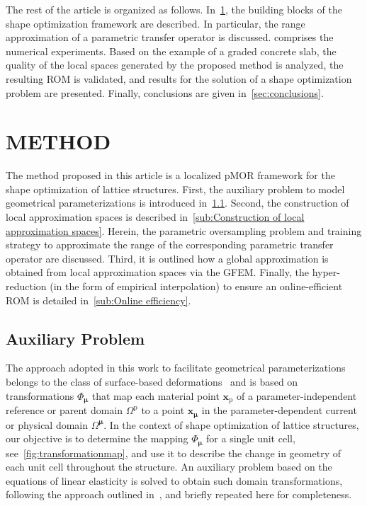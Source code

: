 \documentclass[a4paper]{eccomas_paper-2024}
\begin{document}
The rest of the article is organized as follows.
In~\cref{sec:method}, the building blocks of the shape optimization framework are described.
In particular, the range approximation of a parametric transfer operator is discussed.
 comprises the numerical experiments.
Based on the example of a graded concrete slab, the quality of the local spaces generated by the proposed method is analyzed, the resulting ROM is validated, and results for the solution of a shape optimization problem are presented.
Finally, conclusions are given in~\cref{sec:conclusions}.


\section{METHOD}%
\label{sec:method}
The method proposed in this article is a localized pMOR framework for the shape optimization of lattice structures.
First, the auxiliary problem to model geometrical parameterizations is introduced in~\cref{sub:Auxiliary Problem}.
Second, the construction of local approximation spaces is described in~\cref{sub:Construction of local approximation spaces}.
Herein, the parametric oversampling problem and training strategy to approximate the range of the corresponding parametric transfer operator are discussed.
Third, it is outlined how a global approximation is obtained from local approximation spaces via the GFEM.
Finally, the hyper-reduction (in the form of empirical interpolation) to ensure an online-efficient ROM is detailed in~\cref{sub:Online efficiency}.

\subsection{Auxiliary Problem} %
\label{sub:Auxiliary Problem}
The approach adopted in this work to facilitate geometrical parameterizations belongs to the class of surface-based deformations~\cite{Botsch2010Polygon} and is based on transformations $\Phi_{\bm\mu}$ that map each material point $\bm{x}_{\mathrm{p}}$ of a parameter-independent reference or parent domain $\varOmega^{\mathrm{p}}$ to a point $\bm{x}_{\bm\mu}$ in the parameter-dependent current or physical domain $\varOmega^{\bm\mu}$.
In the context of shape optimization of lattice structures, our objective is to determine the mapping $\Phi_{\bm\mu}$ for a single unit cell, see~\cref{fig:transformationmap}, and use it to describe the change in geometry of each unit cell throughout the structure.
An auxiliary problem based on the equations of linear elasticity is solved to obtain such domain transformations, following the approach outlined in~\cite{Guo2022Learning}, and briefly repeated here for completeness.
\end{document}
